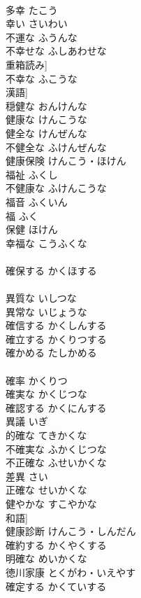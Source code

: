 \documentclass[8pt]{extreport}
\begin{document}
\begin{CJK}{UTF8}{min}
\\	多幸	たこう	
\\	幸い	さいわい	
\\	不運な	ふうんな	
\\	不幸せな	ふしあわせな	
\\	重箱読み]
\\	不幸な	ふこうな	
\\	漢語]
\\	穏健な	おんけんな	
\\	健康な	けんこうな	
\\	健全な	けんぜんな	
\\	不健全な	ふけんぜんな	
\\	健康保険	けんこう・ほけん	
\\	福祉	ふくし	
\\	不健康な	ふけんこうな	
\\	福音	ふくいん	
\\	福	ふく	
\\	保健	ほけん	
\\	幸福な	こうふくな	
\\	[漢語]
\\	確保する	かくほする	
\\	[漢語]
\\	異質な	いしつな	
\\	異常な	いじょうな	
\\	確信する	かくしんする	
\\	確立する	かくりつする	
\\	確かめる	たしかめる	
\\	[和語]
\\	確率	かくりつ	
\\	確実な	かくじつな	
\\	確認する	かくにんする	
\\	異議	いぎ	
\\	的確な	てきかくな	
\\	不確実な	ふかくじつな	
\\	不正確な	ふせいかくな	
\\	差異	さい	
\\	正確な	せいかくな	
\\	健やかな	すこやかな	
\\	和語]
\\	健康診断	けんこう・しんだん	
\\	確約する	かくやくする	
\\	明確な	めいかくな	
\\	徳川家康	とくがわ・いえやす	
\\	確定する	かくていする	

\end{CJK}
\end{document}
